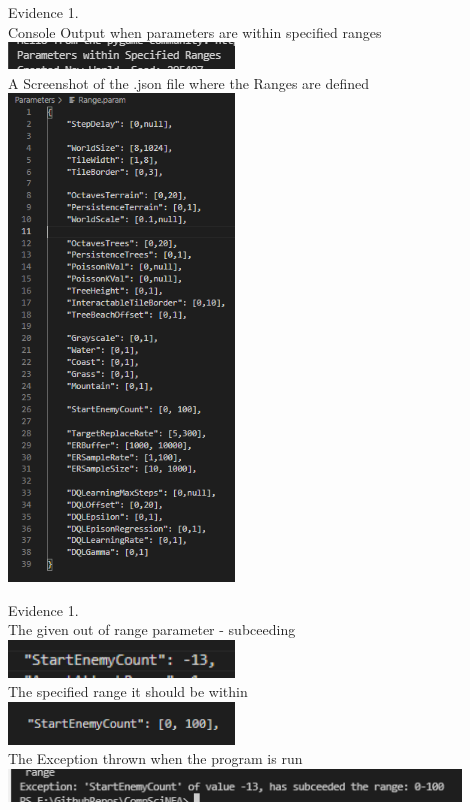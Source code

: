 \begin{flushleft}
\begin{center}
        {\large Evidence 1.\rn } \\ 
        \vspace{0.3cm}
        Console Output when parameters are within specified ranges \\
        \includegraphics[width=6cm]{Images/Testing/T1.2.1.PNG} \\
        A Screenshot of the .json file where the Ranges are defined \\
        \includegraphics[width=6cm]{Images/Testing/T1.2.2.PNG}
        \vspace{1cm}

        {\large Evidence 1.\rn } \\ 
        \vspace{0.3cm}
        The given out of range parameter - subceeding \\
        \includegraphics[width=6cm]{Images/Testing/T1.3.1.PNG} \\
        The specified range it should be within \\
        \includegraphics[width=6cm]{Images/Testing/T1.3.2.PNG} \\
        The Exception thrown when the program is run \\
        \includegraphics[width=12cm]{Images/Testing/T1.3.3.PNG} \\
        \vspace{1cm}


\end{center}
\end{flushleft}
